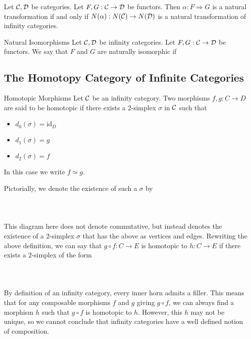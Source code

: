 \documentclass[a4paper]{article}
\begin{document}
\begin{lmm}{}{} Let $\mathcal{C},\mathcal{D}$ be categories. Let $F,G:\mathcal{C}\to\mathcal{D}$ be functors. Then $\alpha:F\Rightarrow G$ is a natural transformation if and only if $N(\alpha):N(\mathcal{C})\to N(\mathcal{D})$ is a natural transformation of infinity categories. 
\end{lmm}

\begin{defn}{Natural Isomorphisms}{} Let $\mathcal{C},\mathcal{D}$ be infinity categories. Let $F,G:\mathcal{C}\to\mathcal{D}$ be functors. We say that $F$ and $G$ are naturally isomorphic if 
\end{defn}

\subsection{The Homotopy Category of Infinite Categories}
\begin{defn}{Homotopic Morphisms}{} Let $\mathcal{C}$ be an infinity category. Two morphisms $f,g:C\to D$ are said to be homotopic if there exists a $2$-simplex $\sigma$ in $\mathcal{C}$ such that 
\begin{itemize}
\item $d_0(\sigma)=\text{id}_D$
\item $d_1(\sigma)=g$
\item $d_2(\sigma)=f$
\end{itemize}
In this case we write $f\simeq g$. 
\end{defn}

Pictorially, we denote the existence of such a $\sigma$ by \\~\\
\\~\\

This diagram here does not denote commutative, but instead denotes the existence of a $2$-simplex $\sigma$ that has the above as vertices and edges. Rewriting the above definition, we can say that $g\circ f:C\to E$ is homotopic to $h:C\to E$ if there exists a $2$-simplex of the form \\~\\
\\~\\
By definition of an infinity category, every inner horn admits a filler. This means that for any composable morphisms $f$ and $g$ giving $g\circ f$, we can always find a morphism $h$ such that $g\circ f$ is homotopic to $h$. However, this $h$ may not be unique, so we cannot conclude that infinity categories have a well defined notion of composition. 
\end{document}
